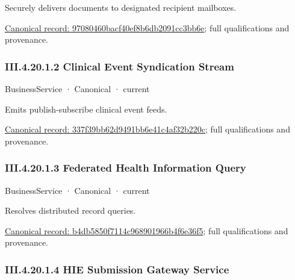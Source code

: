 Securely delivers documents to designated recipient mailboxes.


{\footnotesize \href{../../../../continuum/business/business-service/97080460bacf40ef8b6db2091cc3bb6e.md}{Canonical record: 97080460bacf40ef8b6db2091cc3bb6e}; full qualifications and provenance.}\par
\subsubsection*{III.4.20.1.2 Clinical Event Syndication Stream}
\label{navigation:III.4.20.1.2}

\label{element:337f39bb62d9491bb6e41c4af32b220c}
{\small BusinessService · Canonical · current}\par

Emits publish-subscribe clinical event feeds.


{\footnotesize \href{../../../../continuum/business/business-service/337f39bb62d9491bb6e41c4af32b220c.md}{Canonical record: 337f39bb62d9491bb6e41c4af32b220c}; full qualifications and provenance.}\par
\subsubsection*{III.4.20.1.3 Federated Health Information Query}
\label{navigation:III.4.20.1.3}

\label{element:b4db5850f7114c968901966b4f6e36f5}
{\small BusinessService · Canonical · current}\par

Resolves distributed record queries.


{\footnotesize \href{../../../../continuum/business/business-service/b4db5850f7114c968901966b4f6e36f5.md}{Canonical record: b4db5850f7114c968901966b4f6e36f5}; full qualifications and provenance.}\par
\subsubsection*{III.4.20.1.4 HIE Submission Gateway Service}
\label{navigation:III.4.20.1.4}

